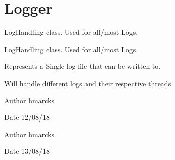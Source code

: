 \hypertarget{group__Logger}{}\section{Logger}
\label{group__Logger}


Log\+Handling class. Used for all/most Logs.  


Log\+Handling class. Used for all/most Logs. 

Represents a Single log file that can be written to.

Will handle different logs and their respective threads

\begin{DoxyAuthor}{Author}
hmarcks
\end{DoxyAuthor}
\begin{DoxyDate}{Date}
12/08/18
\end{DoxyDate}
\begin{DoxyAuthor}{Author}
hmarcks
\end{DoxyAuthor}
\begin{DoxyDate}{Date}
13/08/18 
\end{DoxyDate}

